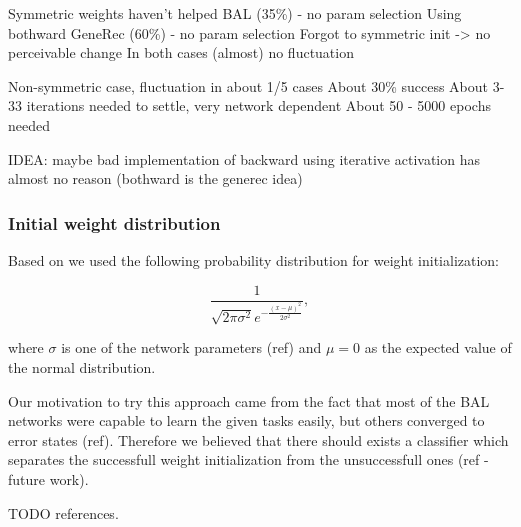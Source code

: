Symmetric weights haven't helped BAL (35\%) - no param selection
Using bothward GeneRec (60\%) - no param selection 
  Forgot to symmetric init -> no perceivable change 
In both cases (almost) no fluctuation 

Non-symmetric case, fluctuation in about 1/5 cases 
  About 30\% success 
  About 3-33 iterations needed to settle, very network dependent 
  About 50 - 5000 epochs needed 

IDEA: maybe bad implementation of backward
      using iterative activation has almost no reason (bothward is the generec idea) 


\subsubsection{Initial weight distribution} 
\label{sec:our-sigma} 

Based on \citet{o1996bio} we used the following probability distribution for weight initialization: 

\begin{equation} 
\frac{1}{\sqrt{2\pi \sigma^2} e^{-\frac{(x-\mu)^2}{2\sigma^2}}},
\end{equation} 

where $\sigma$ is one of the network parameters (ref) and $\mu = 0$ as the expected value of the normal distribution. 

Our motivation to try this approach came from the fact that most of the BAL networks were capable to learn the given tasks easily, but others converged to error states (ref). Therefore we believed that there should exists a classifier which separates the successfull weight initialization from the unsuccessfull ones (ref - future work). 

TODO references.

